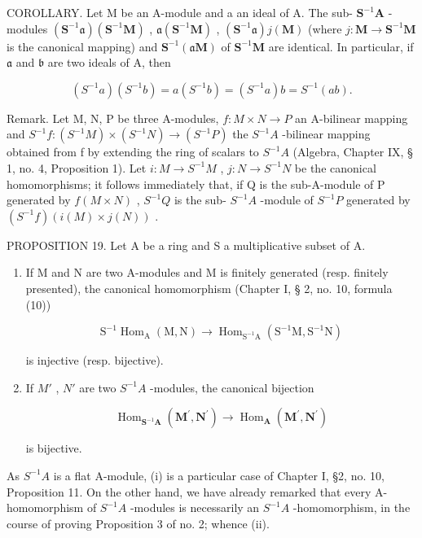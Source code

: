 COROLLARY. Let M be an A-module and a an ideal of A. The sub- \(\mathbf{S}^{-1}\mathbf{A}\) -modules \((\mathbf{S}^{-1}\mathfrak{a})(\mathbf{S}^{-1}\mathbf{M})\) , \(\mathfrak{a}(\mathbf{S}^{-1}\mathbf{M})\) , \((\mathbf{S}^{-1}\mathfrak{a})j(\mathbf{M})\) (where \(j: \mathbf{M} \to \mathbf{S}^{-1}\mathbf{M}\) is the canonical mapping) and \(\mathbf{S}^{-1}(\mathfrak{a}\mathbf{M})\) of \(\mathbf{S}^{-1}\mathbf{M}\) are identical. In particular, if \(\mathfrak{a}\) and \(\mathfrak{b}\) are two ideals of A, then

\[
(S ^ {- 1} a) (S ^ {- 1} b) = a (S ^ {- 1} b) = (S ^ {- 1} a) b = S ^ {- 1} (a b).
\]

Remark. Let M, N, P be three A-modules, \(f: M \times N \to P\) an A-bilinear mapping and \(S^{-1}f: (S^{-1}M) \times (S^{-1}N) \to (S^{-1}P)\) the \(S^{-1}A\) -bilinear mapping obtained from f by extending the ring of scalars to \(S^{-1}A\) (Algebra, Chapter IX, § 1, no. 4, Proposition 1). Let \(i: M \to S^{-1}M\) , \(j: N \to S^{-1}N\) be the canonical homomorphisms; it follows immediately that, if Q is the sub-A-module of P generated by \(f(M \times N)\) , \(S^{-1}Q\) is the sub- \(S^{-1}A\) -module of \(S^{-1}P\) generated by \((S^{-1}f)(i(M) \times j(N))\) .

PROPOSITION 19. Let A be a ring and S a multiplicative subset of A.

\begin{enumerate}
\def\labelenumi{(\roman{enumi})}
\tightlist
\item
  If M and N are two A-modules and M is finitely generated (resp. finitely presented), the canonical homomorphism (Chapter I, § 2, no. 10, formula (10))

\[
\mathrm{S} ^ {- 1} \operatorname{Hom} _ {\mathrm{A}} (\mathrm{M}, \mathrm{N}) \rightarrow \operatorname{Hom} _ {\mathrm{S} ^ {- 1} \mathrm{A}} (\mathrm{S} ^ {- 1} \mathrm{M}, \mathrm{S} ^ {- 1} \mathrm{N})
\]

is injective (resp. bijective).

\item
  If \(M'\) , \(N'\) are two \(S^{-1}A\) -modules, the canonical bijection

\[
\operatorname{Hom} _ {\mathbf {S} ^ {- 1} \mathbf {A}} (\mathbf {M} ^ {\prime}, \mathbf {N} ^ {\prime}) \rightarrow \operatorname{Hom} _ {\mathbf {A}} (\mathbf {M} ^ {\prime}, \mathbf {N} ^ {\prime})
\]

is bijective.

\end{enumerate}
As \(S^{-1}A\) is a flat A-module, (i) is a particular case of Chapter I, §2, no. 10, Proposition 11. On the other hand, we have already remarked that every A-homomorphism of \(S^{-1}A\) -modules is necessarily an \(S^{-1}A\) -homomorphism, in the course of proving Proposition 3 of no. 2; whence (ii).

